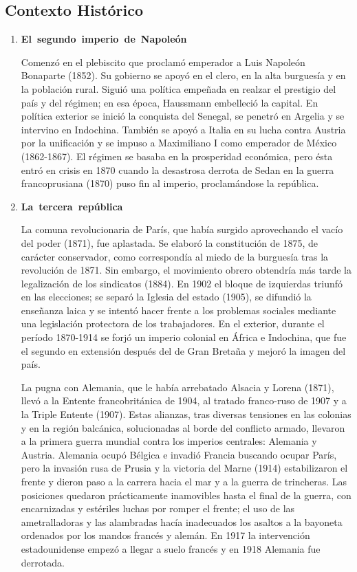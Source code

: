 \subsection{Contexto Hist\'orico}

\begin{enumerate}
\item \textbf{El\ segundo\ imperio\ de\ Napole\'on}

 Comenz\'o en el plebiscito que proclam\'o emperador a Luis Napole\'on Bonaparte (1852). Su gobierno se apoy\'o en el clero, en la alta burgues\'ia y en la poblaci\'on rural. Sigui\'o una pol\'itica empe\~nada en realzar el prestigio del pa\'is y del r\'egimen; en esa \'epoca, Haussmann embelleci\'o la capital. En pol\'itica exterior se inici\'o la conquista del Senegal, se penetr\'o en Argelia y se intervino en Indochina. Tambi\'en se apoy\'o a Italia en su lucha contra Austria por la unificaci\'on y se impuso a Maximiliano I como emperador de M\'exico (1862-1867). El r\'egimen se basaba en la prosperidad econ\'omica, pero \'esta entr\'o en crisis en 1870 cuando la desastrosa derrota de Sedan en la guerra francoprusiana (1870) puso fin al imperio, proclam\'andose la rep\'ublica.

\item \textbf{La\ tercera\ rep\'ublica}

La comuna revolucionaria de Par\'is, que hab\'ia surgido aprovechando el vac\'io del poder (1871), fue aplastada. Se elabor\'o la constituci\'on de 1875, de car\'acter conservador, como correspond\'ia al miedo de la burgues\'ia tras la revoluci\'on de 1871. Sin embargo, el movimiento obrero obtendr\'ia m\'as tarde la legalizaci\'on de los sindicatos (1884). En 1902 el bloque de izquierdas triunf\'o en las elecciones; se separ\'o la Iglesia del estado (1905), se difundi\'o la ense\~nanza laica y se intent\'o hacer frente a los problemas sociales mediante una legislaci\'on protectora de los trabajadores. En el exterior, durante el per\'iodo 1870-1914 se forj\'o un imperio colonial en \'Africa e Indochina, que fue el segundo en extensi\'on despu\'es del de Gran Breta\~na y mejor\'o la imagen del pa\'is.

La pugna con Alemania, que le hab\'ia arrebatado Alsacia y Lorena (1871), llev\'o a la Entente francobrit\'anica de 1904, al tratado franco-ruso de 1907 y a la Triple Entente (1907). Estas alianzas, tras diversas tensiones en las colonias y en la regi\'on balc\'anica, solucionadas al borde del conflicto armado, llevaron a la primera guerra mundial contra los imperios centrales: Alemania y Austria. Alemania ocup\'o B\'elgica e invadi\'o Francia buscando ocupar Par\'is, pero la invasi\'on rusa de Prusia y la victoria del Marne (1914) estabilizaron el frente y dieron paso a la carrera hacia el mar y a la guerra de trincheras. Las posiciones quedaron pr\'acticamente inamovibles hasta el final de la guerra, con encarnizadas y est\'eriles luchas por romper el frente; el uso de las ametralladoras y las alambradas hac\'ia inadecuados los asaltos a la bayoneta ordenados por los mandos franc\'es y alem\'an. En 1917 la intervenci\'on estadounidense empez\'o a llegar a suelo franc\'es y en 1918 Alemania fue derrotada.
\end{enumerate}
\newpage
